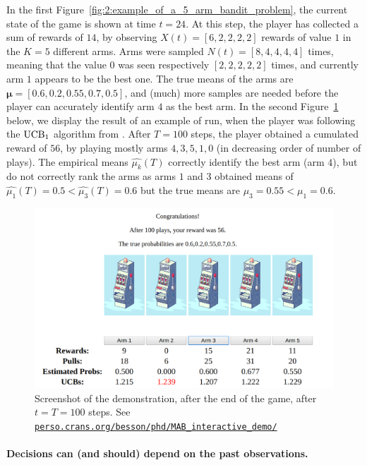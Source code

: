 In the first Figure~\ref{fig:2:example_of_a_5_arm_bandit_problem}, the current state of the game is shown at time $t=24$.
At this step, the player has collected a sum of rewards of $14$, by observing $X(t) = [6,2,2,2,2]$ rewards of value $1$ in the $K=5$ different arms. Arms were sampled $N(t) = [8,4,4,4,4]$ times, meaning that the value $0$ was seen respectively $[2,2,2,2,2]$ times, and currently arm $1$ appears to be the best one. The true means of the arms are $\bm{\mu}=[0.6, 0.2, 0.55, 0.7, 0.5]$, and (much) more samples are needed before the player can accurately identify arm $4$ as the best arm.
%
In the second Figure~\ref{fig:2:example_of_a_5_arm_bandit_problem__step100} below, we display the result of an example of run, when the player was following the $\mathrm{UCB}_1$ algorithm from \cite{Auer02}.
After $T=100$ steps, the player obtained a cumulated reward of $56$, by playing mostly arms $4,3,5,1,0$ (in decreasing order of number of plays). The empirical means $\widehat{\mu_k}(T)$ correctly identify the best arm (arm $4$), but do not correctly rank the arms as arms $1$ and $3$ obtained means of $\widehat{\mu_1}(T) = 0.5 < \widehat{\mu_3}(T)=0.6$ but the true means are $\mu_3 = 0.55 < \mu_1 = 0.6$.

\begin{figure}[h!]  %
    \centering
    \includegraphics[width=0.85\linewidth]{2-Chapters/2-Chapter/Images/example_of_a_5_arm_bandit_problem__step100.png}
    \caption{Screenshot of the demonstration, after the end of the game, after $t=T=100$ steps.  See \href{https://perso.crans.org/besson/phd/MAB\_interactive\_demo/}{\texttt{perso.crans.org/besson/phd/MAB\_interactive\_demo/}}}
    \label{fig:2:example_of_a_5_arm_bandit_problem__step100}
\end{figure}


\paragraph{Decisions can (and should) depend on the past observations.}

